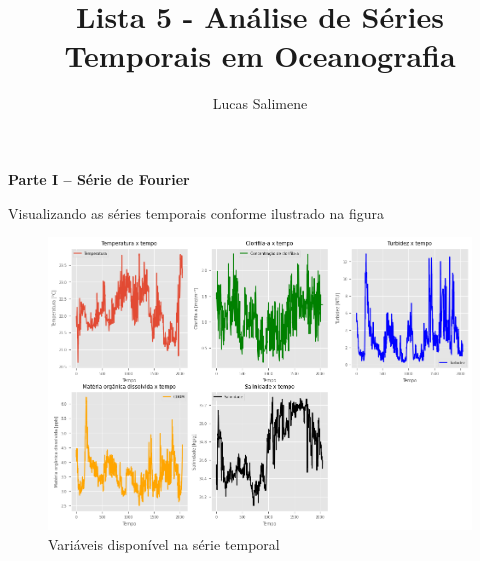 \documentclass[12pt,a4paper,portuguese]{article}
\title{Lista 5 - Análise de Séries Temporais em Oceanografia}
\author{Lucas Salimene}
\date{}
\begin{document}
	\maketitle
	\newpage
	\textbf{Parte I – Série de Fourier}
	
	Visualizando as séries temporais conforme ilustrado na figura
	
\begin{figure}[H]
	\centering
	\includegraphics[width=1\linewidth]{lista5-1b}
	\caption{Variáveis disponível na série temporal}
	\label{fig:lista5-1b}
\end{figure}
\end{document}
